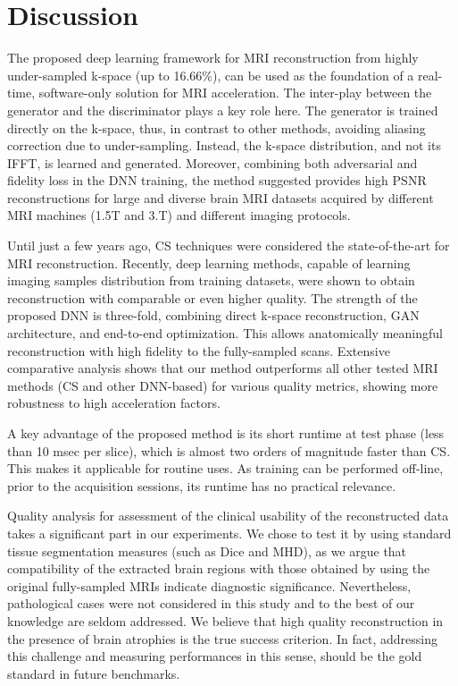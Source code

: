 \documentclass[10pt,journal,compsoc]{IEEEtran}
\begin{document}
\section{Discussion}\label{conclusions_section}
The proposed deep learning framework for MRI reconstruction from highly under-sampled k-space (up to 16.66\%), can be used as the foundation of a real-time, software-only solution for MRI acceleration.
The inter-play between the generator and the discriminator plays a key role here. The generator is trained directly on the k-space, thus, in contrast to other methods, avoiding aliasing correction due to under-sampling.
Instead, the k-space distribution, and not its IFFT, is learned and generated. Moreover, combining both adversarial and fidelity loss in the DNN training, the method suggested provides high PSNR reconstructions for large and diverse brain MRI datasets acquired by different MRI machines (1.5T and 3.T) and different imaging protocols.

Until just a few years ago, CS techniques were considered the state-of-the-art for MRI reconstruction. Recently, deep learning methods, capable of learning imaging samples distribution from training datasets, were shown to obtain reconstruction with comparable or even higher quality. The strength of the proposed DNN is three-fold, combining direct k-space reconstruction, GAN architecture, and end-to-end optimization.
This allows anatomically meaningful reconstruction with high fidelity to the fully-sampled scans. Extensive comparative analysis shows that our method outperforms all other tested MRI methods (CS and other DNN-based) for various quality metrics, showing more robustness to high acceleration factors.

A key advantage of the proposed method is its short runtime at test phase (less than 10 msec per slice), which is almost two orders of magnitude faster than CS. This makes it applicable for routine uses. As training can be performed off-line, prior to the acquisition sessions, its runtime has no practical relevance.

Quality analysis for assessment of the clinical usability of the reconstructed data takes a significant part in our experiments.
We chose to test it by using standard tissue segmentation measures (such as Dice and MHD), as we argue that compatibility of the extracted brain regions with those obtained by using the original fully-sampled MRIs indicate diagnostic significance. Nevertheless, pathological cases were not considered in this study and to the best of our knowledge are seldom addressed. We believe that high quality reconstruction in the presence of brain atrophies is the true success criterion. In fact, addressing this challenge and measuring performances in this sense, should be the gold standard in future benchmarks.
\end{document}
